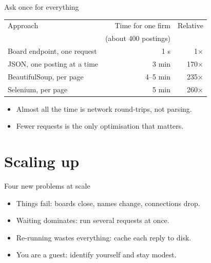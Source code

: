 \documentclass[11pt,aspectratio=169]{beamer}
\newenvironment{wideitemize}
  {\begin{itemize}\setlength{\itemsep}{10pt}}
  {\end{itemize}}
\begin{document}
\begin{frame}{Ask once for everything}
\begin{table}
\centering\small
\begin{tabular}{lrr}
\toprule
Approach & Time for one firm & Relative \\
 & (about 400 postings) & \\
\midrule
Board endpoint, one request & 1 s          & 1$\times$ \\
JSON, one posting at a time & 3 min        & 170$\times$ \\
BeautifulSoup, per page     & 4--5 min     & 235$\times$ \\
Selenium, per page          & 5 min        & 260$\times$ \\
\bottomrule
\end{tabular}
\end{table}

\vspace{0.5em}
\begin{wideitemize}
  \item Almost all the time is network round-trips, not parsing.
  \item Fewer requests is the only optimisation that matters.
\end{wideitemize}
\end{frame}

\section{Scaling up}
\begin{frame}{Four new problems at scale}
\begin{wideitemize}
  \item Things fail: boards close, names change, connections drop.
  \item Waiting dominates: run several requests at once.
  \item Re-running wastes everything: cache each reply to disk.
  \item You are a guest: identify yourself and stay modest.
\end{wideitemize}
\end{frame}
\end{document}
